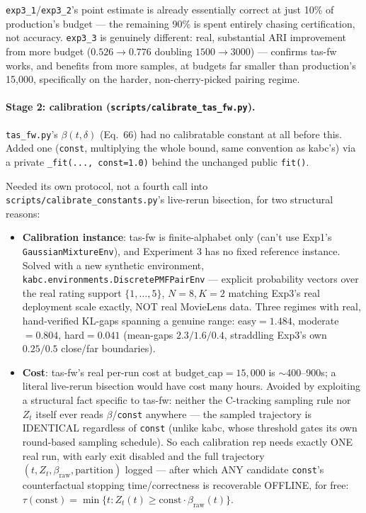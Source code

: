 \documentclass[11pt]{article}
\begin{document}
\texttt{exp3\_1}/\texttt{exp3\_2}'s point estimate is already essentially
correct at just 10\% of production's budget --- the remaining 90\% is
spent entirely chasing certification, not accuracy. \texttt{exp3\_3} is
genuinely different: real, substantial ARI improvement from more budget
($0.526\to0.776$ doubling $1500\to3000$) --- confirms tas-fw works, and
benefits from more samples, at budgets far smaller than production's
15{,}000, specifically on the harder, non-cherry-picked pairing regime.

\paragraph{Stage 2: calibration (\texttt{scripts/calibrate\_tas\_fw.py}).}
\texttt{tas\_fw.py}'s $\beta(t,\delta)$ (Eq.~66) had no calibratable
constant at all before this. Added one (\texttt{const}, multiplying the
whole bound, same convention as kabc's) via a private
\texttt{\_fit(..., const=1.0)} behind the unchanged public \texttt{fit()}.

Needed its own protocol, not a fourth call into
\texttt{scripts/calibrate\_constants.py}'s live-rerun bisection, for two
structural reasons:

\begin{itemize}
\item \textbf{Calibration instance}: tas-fw is finite-alphabet only (can't
use Exp1's \texttt{GaussianMixtureEnv}), and Experiment 3 has no fixed
reference instance. Solved with a new synthetic environment,
\texttt{kabc.environments.DiscretePMFPairEnv} --- explicit probability
vectors over the real rating support $\{1,\ldots,5\}$, $N{=}8, K{=}2$
matching Exp3's real deployment scale exactly, NOT real MovieLens data.
Three regimes with real, hand-verified KL-gaps spanning a genuine range:
easy$=1.484$, moderate$=0.804$, hard$=0.041$ (mean-gaps $2.3/1.6/0.4$,
straddling Exp3's own $0.25/0.5$ close/far boundaries).
\item \textbf{Cost}: tas-fw's real per-run cost at $\text{budget\_cap}=15{,}000$
is $\sim$400--900s; a literal live-rerun bisection would have cost many
hours. Avoided by exploiting a structural fact specific to tas-fw: neither
the C-tracking sampling rule nor $Z_t$ itself ever reads $\beta$/\texttt{const}
anywhere --- the sampled trajectory is IDENTICAL regardless of
\texttt{const} (unlike kabc, whose threshold gates its own round-based
sampling schedule). So each calibration rep needs exactly ONE real run,
with early exit disabled and the full trajectory $(t, Z_t, \beta_{\text{raw}},
\text{partition})$ logged --- after which ANY candidate \texttt{const}'s
counterfactual stopping time/correctness is recoverable OFFLINE, for free:
$\tau(\text{const}) = \min\{t : Z_t(t) \ge \text{const}\cdot\beta_{\text{raw}}(t)\}$.
\end{itemize}
\end{document}
